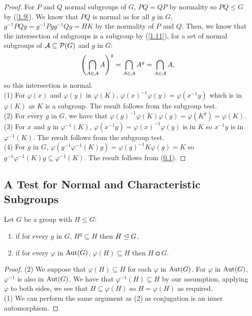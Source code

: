 \begin{proof}
    For $P$ and $Q$ normal subgroups of $G$, $PQ = QP$ by normality so
    $PQ \leq G$ by (\ref{1.9}). We know that $PQ$ is normal as for all $g$ in $G$,
    $g^{-1}PQg = g^{-1}Pgg^{-1}Qg = HK$ by the normality of $P$ and $Q$.
    Then, we know that the intersection of subgroups is a subgroup by (\ref{1.11}),
    for a set of normal subgroups of $\mathcal{A} \subseteq \mathcal{P}(G)$ and $g$ in $G$: \begin{align*}
        \left( \bigcap_{A \in \mathcal{A}}A \right)^g
        = \bigcap_{A \in \mathcal{A}} A^g
        = \bigcap_{A \in \mathcal{A}} A,
    \end{align*} so this intersection is normal.
    \\[\baselineskip]
    (1) For $\varphi(x)$ and $\varphi(y)$ in $\varphi(K)$, 
    $\varphi(x)^{-1}\varphi(y) = \varphi(x^{-1}y)$ which is in $\varphi(K)$ as $K$ is
    a subgroup. The result follows from the subgroup test.
    \\[\baselineskip]
    (2) For every $g$ in $G$, we have that 
    $\varphi(g)^{-1}\varphi(K)\varphi(g) = \varphi(K^g) = \varphi(K)$.
    \\[\baselineskip]
    (3) For $x$ and $y$ in $\varphi^{-1}(K)$, $\varphi(x^{-1}y) = \varphi(x)^{-1}\varphi(y)$
    is in $K$ so $x^{-1}y$ is in $\varphi^{-1}(K)$. The result follows from the subgroup test.
    \\[\baselineskip]
    (4) For $g$ in $G$, $\varphi(g^{-1}\varphi^{-1}(K)g) = \varphi(g)^{-1}K\varphi(g) = K$
    so $g^{-1}\varphi^{-1}(K)g \subseteq \varphi^{-1}(K)$. The result follows from (\ref{2.12}).
\end{proof}

\subsection{A Test for Normal and Characteristic Subgroups} \label{2.12}

Let $G$ be a group with $H \leq G$: \begin{enumerate}
    \item if for every $g$ in $G$, $H^g \subseteq H$ then $H \trianglelefteq G$,
    \item if for every $\varphi$ in $\operatorname{Aut}(G)$, $\varphi(H) \subseteq H$ 
        then $H \csub G$.
\end{enumerate}

\begin{proof}
    (2) We suppose that $\varphi(H) \subseteq H$ for each $\varphi$ in $\operatorname{Aut}(G)$.
    For $\varphi$ in $\operatorname{Aut}(G)$, $\varphi^{-1}$ is also in $\operatorname{Aut}(G)$. 
    We have that $\varphi^{-1}(H) \subseteq H$ by our assumption, 
    applying $\varphi$ to both sides, we see that
    $H \subseteq \varphi(H)$ so $H = \varphi(H)$ as required.
    \\[\baselineskip]
    (1) We can perform the same argument as (2) as conjugation is an inner
    automorphism.
\end{proof}

